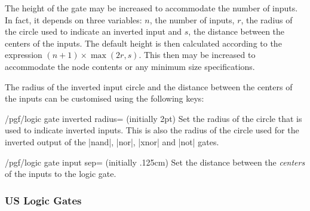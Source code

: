 The height of the gate may be increased to accommodate the number 
of inputs. In fact, it depends on three variables:
$n$, the number of inputs, $r$, the radius of the circle used
to indicate an inverted input and $s$, the distance between
the centers of the inputs.
The default height is then calculated according to the expression 
$(n+1)\times\max(2r,s)$. This then may
be increased to accommodate the node contents or any
minimum size specifications.

The radius of the inverted input circle and the distance between the 
centers of the inputs can be customised using the following keys:

\begin{key}{/pgf/logic gate inverted radius= (initially 2pt)}
  Set the radius of the circle that is used to indicate inverted
  inputs. This is also the radius of the circle used for the inverted
  output of the |nand|, |nor|, |xnor| and |not| gates. 
    
\begin{codeexample}[]
\end{codeexample} 
\end{key}

\begin{key}{/pgf/logic gate input sep= (initially .125cm)}
  Set the distance between the \emph{centers} of the inputs to the
  logic gate. 
  
\begin{codeexample}[]
\end{codeexample} 
\end{key}


\subsubsection{US Logic Gates}

